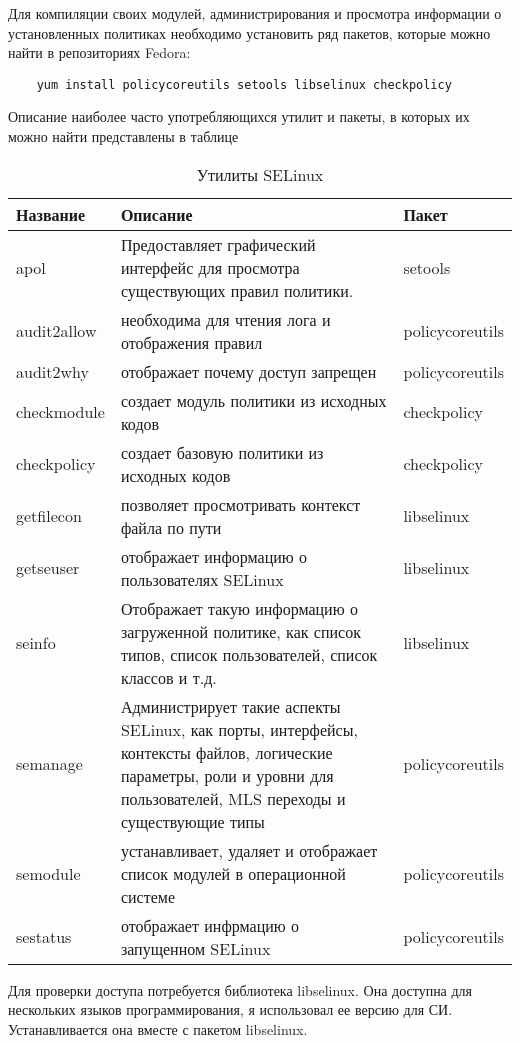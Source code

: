 \documentclass{./../class/UIR}
\begin{document}
	Для компиляции своих модулей, администрирования и просмотра информации о
	установленных политиках необходимо установить ряд пакетов, которые можно найти
	в репозиториях Fedora:
	\begin{verbatim}
	yum install policycoreutils setools libselinux checkpolicy
	\end{verbatim}
Описание наиболее часто употребляющихся утилит и пакеты, в которых их можно
найти представлены в таблице
	
	\begin{longtable}{|p{3cm}|p{11cm}|p{3cm}|} 
	\caption[Утилиты SELinux]{Утилиты SELinux}\label{tag:tableutilsselinux} \\
	\hline
	\textbf{Название} & \textbf{Описание} & \textbf{Пакет} \\
	\endfirsthead
	\hline
	apol & Предоставляет графический интерфейс для просмотра существующих правил
	политики. & setools
	\\
	\hline
	audit2allow & необходима для чтения лога и отображения правил & policycoreutils
	\\
	\hline
	audit2why & отображает почему доступ запрещен & policycoreutils \\
	\hline
	checkmodule & создает модуль политики из исходных кодов & checkpolicy \\
	\hline
	checkpolicy & создает базовую политики из исходных кодов & checkpolicy \\
	\hline
	getfilecon & позволяет просмотривать контекст файла по пути & libselinux \\
	\hline
	getseuser & отображает информацию о пользователях SELinux & libselinux \\
	\hline
	seinfo & Отображает такую информацию о загруженной политике, как список типов,
	список пользователей, список классов и т.д. & libselinux \\
	\hline
	semanage & Администрирует такие аспекты SELinux, как порты, интерфейсы,
	контексты файлов, логические параметры, роли и уровни для пользователей, MLS
	переходы и существующие типы & policycoreutils \\
	\hline
	semodule & устанавливает, удаляет и отображает список модулей в
	операционной системе & policycoreutils \\
	\hline
	sestatus & отображает инфрмацию о запущенном SELinux & policycoreutils \\
	
	
	\hline	
	\end{longtable}
	
	Для проверки доступа потребуется библиотека libselinux. Она доступна для
	нескольких языков программирования, я использовал ее версию для СИ.
	Устанавливается она вместе с пакетом libselinux.
	
\end{document}
